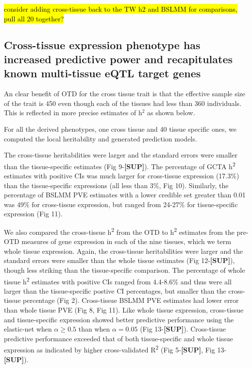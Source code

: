 \documentclass[10pt,letterpaper]{article}
\begin{document}
\hl{consider adding cross-tissue back to the TW h2 and BSLMM for comparisons, pull all 20 together?}

\subsection*{Cross-tissue expression phenotype has increased predictive
power and recapitulates known multi-tissue eQTL target
genes}\label{cross-tissue-expression-phenotype-has-increased-predictive-power-and-recapitulates-known-multi-tissue-eqtl-target-genes}


An clear benefit of OTD for the cross tissue trait is that the effective sample size of the trait is 450 even though each of the tissues had less than 360 individuals. This is reflected in more precise estimates of h$^2$ as shown below.

For all the derived phenotypes, one cross tissue and 40 tissue specific ones, we computed the local heritability and generated prediction models.

The cross-tissue heritabilities were larger and the standard errors were
smaller than the tissue-specific estimates (Fig 9-\textbf{{[}SUP{]}}).
The percentage of GCTA h\textsuperscript{2} estimates with positive CIs
was much larger for cross-tissue expression (17.3\%) than the
tissue-specific expressions (all less than 3\%, Fig 10). Similarly, the
percentage of BSLMM PVE estimates with a lower credible set greater than
0.01 was 49\% for cross-tissue expression, but ranged from 24-27\% for
tissue-specific expression (Fig 11).

We also compared the cross-tissue h\textsuperscript{2} from the OTD to
h\textsuperscript{2} estimates from the pre-OTD measures of gene
expression in each of the nine tissues, which we term whole tissue
expression. Again, the cross-tissue heritabilities were larger and the
standard errors were smaller than the whole tissue estimates (Fig
12-\textbf{{[}SUP{]}}), though less striking than the tissue-specific
comparison. The percentage of whole tissue h\textsuperscript{2}
estimates with positive CIs ranged from 4.4-8.6\% and thus were all
larger than the tissue-specific postive CI percentages, but smaller than
the cross-tissue percentage (Fig 2). Cross-tissue BSLMM PVE estimates
had lower error than whole tissue PVE (Fig 8, Fig 11). Like whole tissue
expression, cross-tissue and tissue-specific expression showed better
predictive performance using the elastic-net when \(\alpha \geq 0.5\)
than when \(\alpha=0.05\) (Fig 13-\textbf{{[}SUP{]}}). Cross-tissue
predictive performance exceeded that of both tissue-specific and whole
tissue expression as indicated by higher cross-validated
R\textsuperscript{2} (Fig 5-\textbf{{[}SUP{]}}, Fig
13-\textbf{{[}SUP{]}}).
\end{document}
